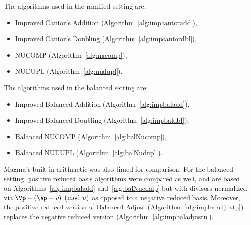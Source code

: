 The algorithms used in the ramified setting are: \begin{itemize}
    \item Improved Cantor's Addition (Algorithm~\ref{alg:impcantoradd}),
    \item Improved Cantor's Doubling (Algorithm~\ref{alg:impcantordbl}),
    \item NUCOMP (Algorithm~\ref{alg:nucomp}),
    \item NUDUPL (Algorithm~\ref{alg:nudupl}).
\end{itemize} The algorithms used in the balanced setting are: \begin{itemize}
    \item Improved Balanced Addition (Algorithm~\ref{alg:impbaladd}),
    \item Improved Balanced Doubling (Algorithm~\ref{alg:impbaldbl}),
    \item Balanced NUCOMP (Algorithm~\ref{alg:balNucomp}),
    \item Balanced NUDUPL (Algorithm~\ref{alg:balNudupl}). \end{itemize} Magma's
built-in arithmetic was also timed for comparison. For the balanced setting,
positive reduced basis algorithms were compared as well, and are based on
Algorithms~\ref{alg:impbaladd} and~\ref{alg:balNucomp} but with divisors
normalized via $\Vp - (\Vp - v) \pmod{u}$ as opposed to a negative reduced
basis. Moreover, the positive reduced version of Balanced Adjust
(Algorithm~\ref{alg:impbaladjustp}) replaces the negative reduced version
(Algorithm~\ref{alg:impbaladjustn}).

